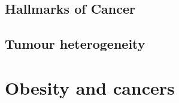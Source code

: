 
\subsection{Hallmarks of Cancer}
\label{subsec:cancerhallmarks}





\subsection{Tumour heterogeneity}
\label{sub:tumour_heterogeneity}




\section{Obesity and cancers}
\label{sec:obesity_and_cancers}

